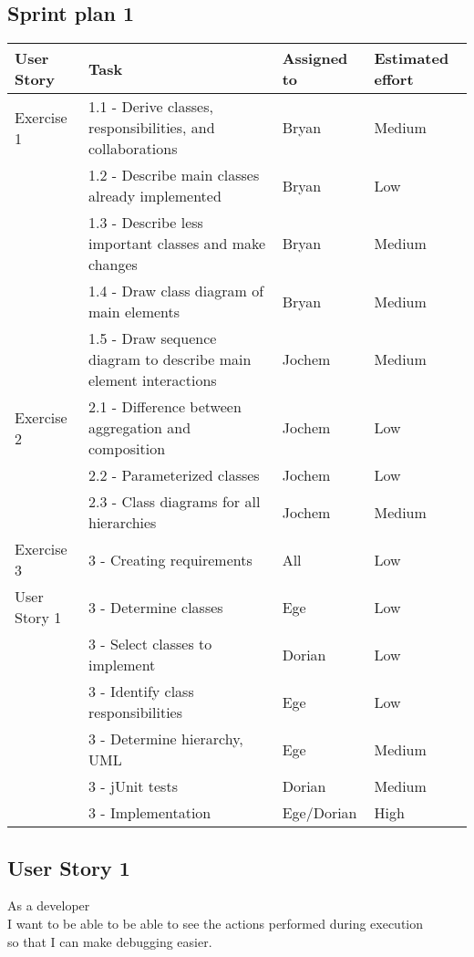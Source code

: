 \documentclass[10pt]{article}
\begin{document}
\begin{center}

\section*{Sprint plan 1}

    \begin{tabular}{ | p{2cm} | p{9cm} | p{2cm} | p{2cm} |}
    \hline
    User Story & Task & Assigned to & Estimated effort \\ \hline
    Exercise 1 & 1.1 - Derive classes, responsibilities, and collaborations & Bryan & Medium \\ 
    & 1.2 - Describe main classes already implemented & Bryan & Low \\
    & 1.3 - Describe less important classes and make changes & Bryan & Medium \\
    & 1.4 - Draw class diagram of main elements & Bryan & Medium \\
    & 1.5 - Draw sequence diagram to describe main element interactions & Jochem & Medium \\ \hline
    Exercise 2 & 2.1 - Difference between aggregation and composition & Jochem & Low \\ 
    & 2.2 - Parameterized classes & Jochem & Low \\
    & 2.3 - Class diagrams for all hierarchies & Jochem & Medium \\ \hline
    Exercise 3 & 3 - Creating requirements & All & Low \\ 
    User Story 1& 3 - Determine classes & Ege & Low \\ 
    & 3 - Select classes to implement & Dorian & Low \\
    & 3 - Identify class responsibilities & Ege & Low \\
    & 3 - Determine hierarchy, UML & Ege & Medium\\
    & 3 - jUnit tests & Dorian & Medium\\
    & 3 - Implementation & Ege/Dorian & High\\ \hline
    \end{tabular}
\end{center}

\subsection*{User Story 1}
As a developer\\ 
\indent I want to be able to be able to see the actions performed during execution\\
so that I can make debugging easier.
\end{document}
